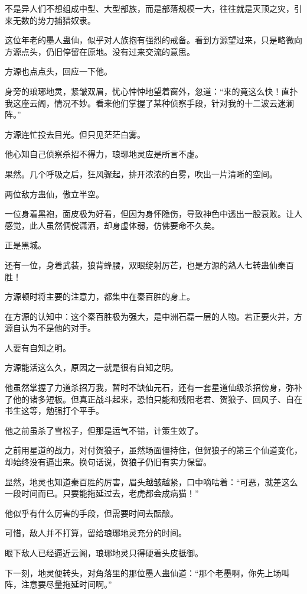 \begin{this_body}
不是异人们不想组成中型、大型部族，而是部落规模一大，往往就是灭顶之灾，引来无数的势力捕猎奴隶。

这位年老的墨人蛊仙，似乎对人族抱有强烈的戒备。看到方源望过来，只是略微向方源点头，仍旧停留在原地。没有过来交流的意思。

方源也点点头，回应一下他。

身旁的琅琊地灵，紧皱双眉，忧心忡忡地望着窗外，忽道：“来的竟这么快！直扑我这座云阁，情况不妙。看来他们掌握了某种侦察手段，针对我的十二波云迷澜阵。”

方源连忙投去目光。但只见茫茫白雾。

他心知自己侦察杀招不得力，琅琊地灵应是所言不虚。

果然。几个呼吸之后，狂风骤起，排开浓浓的白雾，吹出一片清晰的空间。

两位敌方蛊仙，傲立半空。

一位身着黑袍，面皮极为好看，但因为身怀隐伤，导致神色中透出一股衰败。让人感觉，此人虽然倜傥潇洒，却身虚体弱，仿佛要命不久矣。

正是黑城。

还有一位，身着武装，狼背蜂腰，双眼绽射厉芒，也是方源的熟人七转蛊仙秦百胜！

方源顿时将主要的注意力，都集中在秦百胜的身上。

在方源的认知中：这个秦百胜极为强大，是中洲石磊一层的人物。若正要火并，方源自认为不是他的对手。

人要有自知之明。

方源能活这么久，原因之一就是很有自知之明。

他虽然掌握了力道杀招万我，暂时不缺仙元石，还有一套星道仙级杀招傍身，弥补了他的诸多短板。但真正战斗起来，恐怕只能和残阳老君、贺狼子、回风子、自在书生这等，勉强打个平手。

他之前虽杀了雪松子，但那是运气不错，计策生效了。

之前用星道的战力，对付贺狼子，虽然场面僵持住，但贺狼子的第三个仙道变化，却始终没有逼出来。换句话说，贺狼子仍旧有实力保留。

显然，地灵也知道秦百胜的厉害，眉头越皱越紧，口中嘀咕着：“可恶，就差这么一段时间而已。只要能拖延过去，老虎都会成病猫！”

他似乎有什么厉害的手段，但需要时间去酝酿。

可惜，敌人并不打算，留给琅琊地灵充分的时间。

眼下敌人已经逼近云阁，琅琊地灵只得硬着头皮抵御。

下一刻，地灵便转头，对角落里的那位墨人蛊仙道：“那个老墨啊，你先上场叫阵，注意要尽量拖延时间啊。”


\end{this_body}
